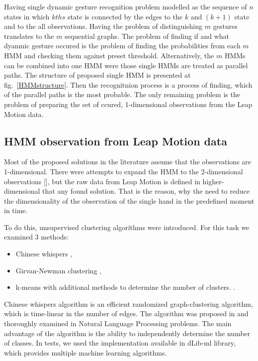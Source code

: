Having single dynamic gesture recognition problem modelled as the sequence of $n$ states in which $kths$ state is connected by the edges to the $k$ and $(k+1)$ state and to the all observations.
Having the problem of distinguishing $m$ gestures translates to the $m$ sequential graphs.
The problem of finding if and what dyanmic gesture occured is the problem of finding the probabilities from each $m$ HMM and checking them against preset threshold.
Alternatively, the $m$ HMMs can be combined into one HMM were those single HMMs are treated as parallel paths.
The structure of proposed single HMM is presented at fig.~\ref{HMMstructure}.
Then the recognitnion process is a process of finding, which of the parallel paths is the most probable.
The only remaining problem is the problem of preparing the set of ccured, 1-dimensional observations from the Leap Motion data.

\subsection{HMM observation from Leap Motion data}

Most of the proposed solutions in the literature assume that the observations are 1-dimensional.
There were attempts to expand the HMM to the 2-dimensional observations [], but the raw data from Leap Motion is defined in higher-dimensional that any found solution.
That is the reason, why the need to reduce the dimensionality of the observation of the single hand in the predefined moment in time.

To do this, unsupervised clustering algorithms were introduced. 
For this task we examined 3 methods:
\begin{itemize}
\item Chinese whispers \cite{CW1, CW2},
\item Girvan-Newman clustering \cite{Newman},
\item k-means with additional methods to determine the number of clusters. \cite{kmeans1, kmeans2}.
\end{itemize}

Chinese whispers algorithm is an efficient randomized graph-clustering algorithm, which is time-linear in the number of edges.
The algorithm was proposed in \cite{CW1} and thoroughly examined in Natural Language Processing problems. 
The main advantage of the algorithm is the ability to independently determine the number of classes. 
In tests, we used the implementation available in dLib-ml library\cite{dlib}, which provides multiple machine learning algorithms.

